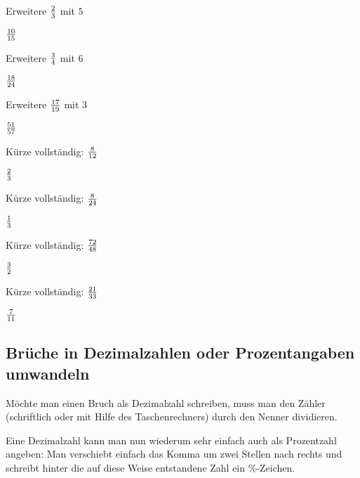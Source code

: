 \documentclass[
  ngerman,
]{book}
\begin{document}
Erweitere \(2 \over 3\) mit \(5\)

\leavevmode\hypertarget{toggleText2}{}%
\(10 \over 15\)

Erweitere \(3 \over 4\) mit \(6\)

\leavevmode\hypertarget{toggleText3}{}%
\(18 \over 24\)

Erweitere \(17 \over 19\) mit \(3\)

\leavevmode\hypertarget{toggleText4}{}%
\(51 \over 57\)

Kürze vollständig: \(8 \over 12\)

\leavevmode\hypertarget{toggleText5}{}%
\(2 \over 3\)

Kürze vollständig: \(8 \over 24\)

\leavevmode\hypertarget{toggleText6}{}%
\(1 \over 3\)

Kürze vollständig: \(72 \over 48\)

\leavevmode\hypertarget{toggleText7}{}%
\(3 \over 2\)

Kürze vollständig: \(21 \over 33\)

\leavevmode\hypertarget{toggleText8}{}%
\(7 \over 11\)

\hypertarget{section-1}{%
\subsubsection*{}\label{section-1}}

\hypertarget{section-2}{%
\subsubsection*{}\label{section-2}}

\hypertarget{bruxfcche-in-dezimalzahlen-oder-prozentangaben-umwandeln}{%
\subsection*{Brüche in Dezimalzahlen oder Prozentangaben umwandeln}\label{bruxfcche-in-dezimalzahlen-oder-prozentangaben-umwandeln}}

Möchte man einen Bruch als Dezimalzahl schreiben, muss man den Zähler (schriftlich oder mit Hilfe des Taschenrechners) durch den Nenner dividieren.

Eine Dezimalzahl kann man nun wiederum sehr einfach auch als Prozentzahl angeben: Man verschiebt einfach das Komma um zwei Stellen nach rechts und schreibt hinter die auf diese Weise entstandene Zahl ein \%-Zeichen.
\end{document}
